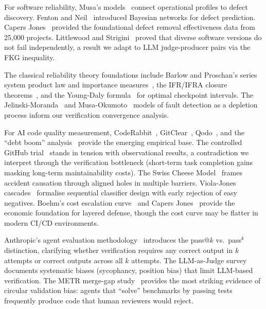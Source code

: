 \documentclass[11pt, a4paper, logo, copyright]{googledeepmind}
\begin{document}
For software reliability, Musa's models~\citep{musa1987} connect operational profiles to defect discovery. Fenton and Neil~\citep{fenton1999} introduced Bayesian networks for defect prediction. Capers Jones~\citep{capersjones2012} provided the foundational defect removal effectiveness data from 25,000 projects. Littlewood and Strigini~\citep{littlewood1993, littlewood2000} proved that diverse software versions do not fail independently, a result we adapt to LLM judge-producer pairs via the FKG inequality.

The classical reliability theory foundations include Barlow and Proschan's series system product law and importance measures~\citep{barlow1965mathematical, barlow1975statistical}, the IFR/IFRA closure theorems~\citep{birnbaum1961stochastic}, and the Young-Daly formula~\citep{young1974first, daly2006higher} for optimal checkpoint intervals. The Jelinski-Moranda~\citep{jelinski1972software} and Musa-Okumoto~\citep{musa1984logarithmic} models of fault detection as a depletion process inform our verification convergence analysis.

For AI code quality measurement, CodeRabbit~\citep{coderabbit2025}, GitClear~\citep{gitclear2025}, Qodo~\citep{qodo2025}, and the ``debt boom'' analysis~\citep{debtboom2026} provide the emerging empirical base. The controlled GitHub trial~\citep{github2024rct} stands in tension with observational results, a contradiction we interpret through the verification bottleneck (short-term task completion gains masking long-term maintainability costs). The Swiss Cheese Model~\citep{reason1990} frames accident causation through aligned holes in multiple barriers. Viola-Jones cascades~\citep{violajones2004} formalise sequential classifier design with early rejection of easy negatives. Boehm's cost escalation curve~\citep{boehm1981} and Capers Jones~\citep{capersjones2012} provide the economic foundation for layered defense, though the cost curve may be flatter in modern CI/CD environments.

Anthropic's agent evaluation methodology~\citep{anthropic2026evals} introduces the pass@$k$ vs.\ pass$^k$ distinction, clarifying whether verification requires any correct output in $k$ attempts or correct outputs across all $k$ attempts. The LLM-as-Judge survey~\citep{li2024survey} documents systematic biases (sycophancy, position bias) that limit LLM-based verification. The METR merge-gap study~\citep{metr2026swebench} provides the most striking evidence of circular validation bias: agents that ``solve'' benchmarks by passing tests frequently produce code that human reviewers would reject.
\end{document}
